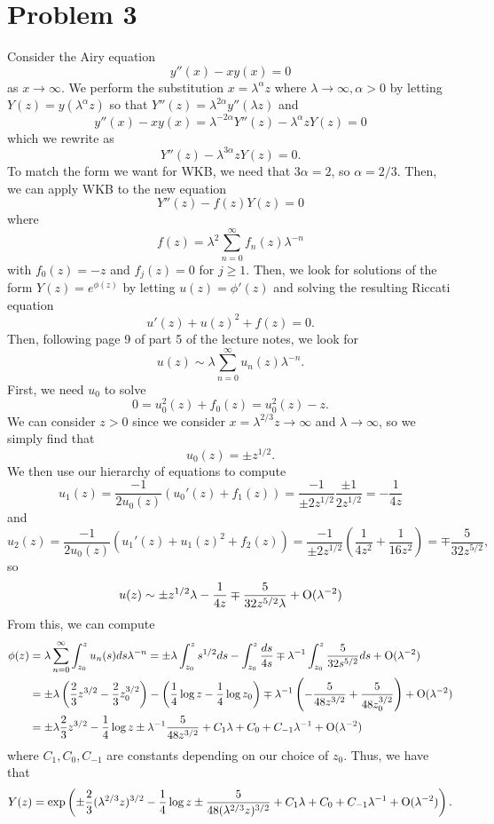 \documentclass{article}
\begin{document}
\section{Problem 3}
Consider the Airy equation
\[
y''(x)-xy(x)=0
\]
as $x\to\infty$. We perform the substitution $x=\lambda^\alpha z$ where $\lambda\to\infty,\alpha>0$ by letting $Y(z)=y(\lambda^\alpha z)$ so that $Y''(z)=\lambda^{2\alpha}y''(\lambda z)$ and
\[
y''(x)-xy(x)=\lambda^{-2\alpha}Y''(z)-\lambda^\alpha zY(z)=0
\]
which we rewrite as
\[
Y''(z)-\lambda^{3\alpha}zY(z)=0.
\]
To match the form we want for WKB, we need that $3\alpha=2$, so $\alpha=2/3$. Then, we can apply WKB to the new equation
\[
Y''(z)-f(z)Y(z)=0
\]
where 
\[
f(z)=\lambda^2\sum_{n=0}^\infty f_n(z)\lambda^{-n}
\]
with $f_0(z)=-z$ and $f_j(z)=0$ for $j\geq1$. Then, we look for solutions of the form $Y(z)=e^{\phi(z)}$ by letting $u(z)=\phi'(z)$ and solving the resulting Riccati equation
\[
u'(z)+u(z)^2+f(z)=0.
\]
Then, following page 9 of part 5 of the lecture notes, we look for 
\[
u(z)\sim\lambda\sum_{n=0}^\infty u_n(z)\lambda^{-n}.
\]
First, we need $u_0$ to solve
\[
0=u_0^2(z)+f_0(z)=u_0^2(z)-z.
\]
We can consider $z>0$ since we consider $x=\lambda^{2/3} z\to\infty$ and $\lambda\to\infty$, so we simply find that
\[
u_0(z)=\pm z^{1/2}.
\]
We then use our hierarchy of equations to compute
\[
u_1(z)=\frac{-1}{2u_0(z)}(u_0'(z)+f_1(z))=\frac{-1}{\pm2z^{1/2}}\frac{\pm1}{2z^{1/2}}=-\frac{1}{4z}
\]
and 
\[
u_2(z)=\frac{-1}{2u_0(z)}(u_1'(z)+u_1(z)^2+f_2(z))=\frac{-1}{\pm2z^{1/2}}\left(\frac{1}{4z^2}+\frac{1}{16z^2}\right)=\mp\frac{5}{32z^{5/2}}, 
\]
so
\[
u(z)\sim \pm z^{1/2}\lambda-\frac{1}{4z}\mp\frac{5}{32z^{5/2}\lambda}+\operatorname{O}(\lambda^{-2})
\]From this, we can compute
\begin{align*}
\phi(z)&=\lambda\sum_{n=0}^\infty \int_{z_0}^zu_n(s)ds\lambda^{-n}=\pm\lambda\int_{z_0}^zs^{1/2}ds-\int_{z_0}^z\frac{ds}{4s}\mp\lambda^{-1}\int_{z_0}^z\frac{5}{32s^{5/2}}ds+\operatorname{O}(\lambda^{-2})\\&=
\pm\lambda\left(\frac{2}{3}z^{3/2}-\frac{2}{3}z_0^{3/2}\right)-\left(\frac{1}{4}\log{z}-\frac{1}{4}\log{z_0}\right)\mp\lambda^{-1}\left(-\frac{5}{48z^{3/2}}+\frac{5}{48z_0^{3/2}}\right)+\operatorname{O}(\lambda^{-2})\\&=
\pm\lambda\frac{2}{3}z^{3/2}-\frac{1}{4}\log{z}\pm\lambda^{-1}\frac{5}{48z^{3/2}}+C_1\lambda+C_0+C_{-1}\lambda^{-1}+\operatorname{O}(\lambda^{-2})
\end{align*}
where $C_1,C_0,C_{-1}$ are constants depending on our choice of $z_0$. Thus, we have that 
\begin{align*}
Y(z)=\exp\left(\pm\frac{2}{3}(\lambda^{2/3} z)^{3/2}-\frac{1}{4}\log{z}\pm\frac{5}{48(\lambda^{2/3} z)^{3/2}}+C_1\lambda+C_0+C_{-1}\lambda^{-1}+\operatorname{O}(\lambda^{-2})\right).
\end{align*}
\end{document}
